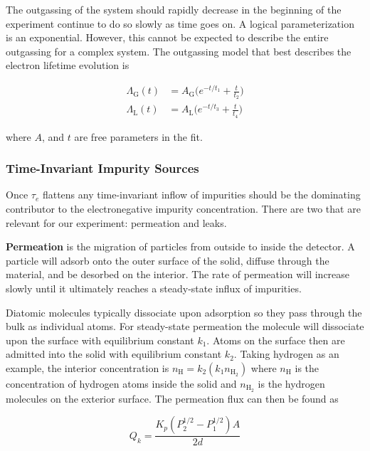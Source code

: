 The outgassing of the system should rapidly decrease in the beginning of the experiment continue to do so slowly as time goes on.  A
logical parameterization is an exponential.  However, this cannot be expected to describe the entire outgassing for a complex
system.  The outgassing model that best describes the electron lifetime evolution is

\begin{subequations}
\begin{align}
\Lambda_{\mathrm{G}}(t) &= A_{\mathrm{G}} \bigg( e^{-t/t_1} + \frac{t}{t_2} \bigg) \\
\Lambda_{\mathrm{L}}(t) &= A_{\mathrm{L}} \bigg( e^{-t/t_3} + \frac{t}{t_4} \bigg)
\end{align}
\end{subequations}

\noindent where $A$, and $t$ are free parameters in the fit.



\subsubsection{Time-Invariant Impurity Sources}
\label{subsubsec:electron_lifetime_model_outgassing_leak_sources}
Once $\tau_e$ flattens any time-invariant inflow of impurities should be the dominating contributor to the electronegative impurity
concentration.  There are two that are relevant for our experiment: permeation and leaks.

\textbf{Permeation} is the migration of particles from outside to inside the detector.  A particle will adsorb onto the outer surface of
the solid, diffuse through the material, and be desorbed on the interior.  The rate of permeation will increase slowly until it ultimately
reaches a steady-state influx of impurities.

Diatomic molecules typically dissociate
upon adsorption so they pass through the bulk as individual atoms.  For steady-state permeation the molecule will dissociate upon the
surface with equilibrium constant $k_1$.  Atoms on the surface then are admitted into the solid with equilibrium constant $k_2$.  Taking
hydrogen as an example, the
interior concentration is $n_{\mathrm{H}} = k_2 (k_1 n_{\mathrm{H_2}})$ where $n_{\mathrm{H}}$ is the concentration of hydrogen atoms
inside the solid and $n_{\mathrm{H_2}}$ is the hydrogen molecules on the exterior surface.  The permeation flux can then be found as

\begin{equation}
Q_k = \frac{K_p (P_2^{1/2} - P_1^{1/2})A}{2d}
\label{eq:electron_lifetime_model_outgassing_leak_sources_perm}
\end{equation}


